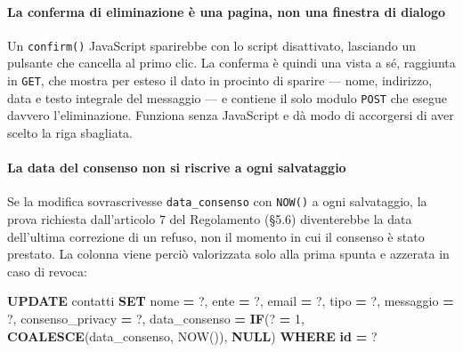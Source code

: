 \documentclass[
  11pt,
]{article}
\newenvironment{Shaded}{\begin{snugshade}}{\end{snugshade}}
\newcommand{\ControlFlowTok}[1]{\textcolor[rgb]{0.13,0.29,0.53}{\textbf{#1}}}
\newcommand{\DecValTok}[1]{\textcolor[rgb]{0.00,0.00,0.81}{#1}}
\newcommand{\FunctionTok}[1]{\textcolor[rgb]{0.13,0.29,0.53}{\textbf{#1}}}
\newcommand{\KeywordTok}[1]{\textcolor[rgb]{0.13,0.29,0.53}{\textbf{#1}}}
\newcommand{\NormalTok}[1]{#1}
\newcommand{\OperatorTok}[1]{\textcolor[rgb]{0.81,0.36,0.00}{\textbf{#1}}}
\begin{document}
\hypertarget{la-conferma-di-eliminazione-uxe8-una-pagina-non-una-finestra-di-dialogo}{%
\paragraph{La conferma di eliminazione è una pagina, non una finestra di
dialogo}\label{la-conferma-di-eliminazione-uxe8-una-pagina-non-una-finestra-di-dialogo}}

Un \texttt{confirm()} JavaScript sparirebbe con lo script disattivato,
lasciando un pulsante che cancella al primo clic. La conferma è quindi
una vista a sé, raggiunta in \texttt{GET}, che mostra per esteso il dato
in procinto di sparire --- nome, indirizzo, data e testo integrale del
messaggio --- e contiene il solo modulo \texttt{POST} che esegue davvero
l'eliminazione. Funziona senza JavaScript e dà modo di accorgersi di
aver scelto la riga sbagliata.

\hypertarget{la-data-del-consenso-non-si-riscrive-a-ogni-salvataggio}{%
\paragraph{La data del consenso non si riscrive a ogni
salvataggio}\label{la-data-del-consenso-non-si-riscrive-a-ogni-salvataggio}}

Se la modifica sovrascrivesse \texttt{data\_consenso} con \texttt{NOW()}
a ogni salvataggio, la prova richiesta dall'articolo 7 del Regolamento
(§5.6) diventerebbe la data dell'ultima correzione di un refuso, non il
momento in cui il consenso è stato prestato. La colonna viene perciò
valorizzata solo alla prima spunta e azzerata in caso di revoca:

\begin{Shaded}
\begin{Highlighting}[]
\KeywordTok{UPDATE}\NormalTok{ contatti}
   \KeywordTok{SET}\NormalTok{ nome }\OperatorTok{=}\NormalTok{ ?, ente }\OperatorTok{=}\NormalTok{ ?, email }\OperatorTok{=}\NormalTok{ ?, tipo }\OperatorTok{=}\NormalTok{ ?, messaggio }\OperatorTok{=}\NormalTok{ ?,}
\NormalTok{       consenso\_privacy }\OperatorTok{=}\NormalTok{ ?,}
\NormalTok{       data\_consenso }\OperatorTok{=} \ControlFlowTok{IF}\NormalTok{(? }\OperatorTok{=} \DecValTok{1}\NormalTok{, }\FunctionTok{COALESCE}\NormalTok{(data\_consenso, NOW()), }\KeywordTok{NULL}\NormalTok{)}
 \KeywordTok{WHERE} \KeywordTok{id} \OperatorTok{=}\NormalTok{ ?}
\end{Highlighting}
\end{Shaded}
\end{document}
